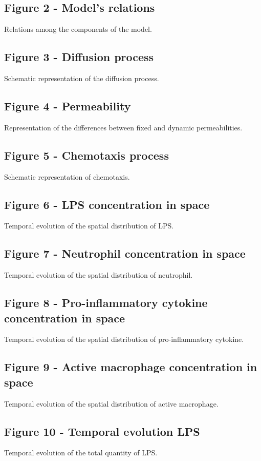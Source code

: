 \documentclass[10pt]{bmc_article}
\newenvironment{bmcformat}{\baselineskip20pt\sloppy\setboolean{publ}{false}}{\baselineskip20pt\sloppy}
\begin{document}
\begin{bmcformat}
\subsection*{Figure 2 - Model's relations}
Relations among the components of the model.

\subsection*{Figure 3 - Diffusion process}
Schematic representation of the diffusion process.

\subsection*{Figure 4 - Permeability}
Representation of the differences between fixed and dynamic permeabilities.

\subsection*{Figure 5 - Chemotaxis process}
Schematic representation of chemotaxis.

\subsection*{Figure 6 - LPS concentration in space}
Temporal evolution of the spatial distribution of LPS.

\subsection*{Figure 7 - Neutrophil concentration in space}
Temporal evolution of the spatial distribution of neutrophil.

\subsection*{Figure 8 - Pro-inflammatory cytokine concentration in space}
Temporal evolution of the spatial distribution of pro-inflammatory cytokine.

\subsection*{Figure 9 - Active macrophage concentration in space}
Temporal evolution of the spatial distribution of active macrophage.

\subsection*{Figure 10 - Temporal evolution LPS}
Temporal evolution of the total quantity of LPS.


\end{bmcformat}
\end{document}
